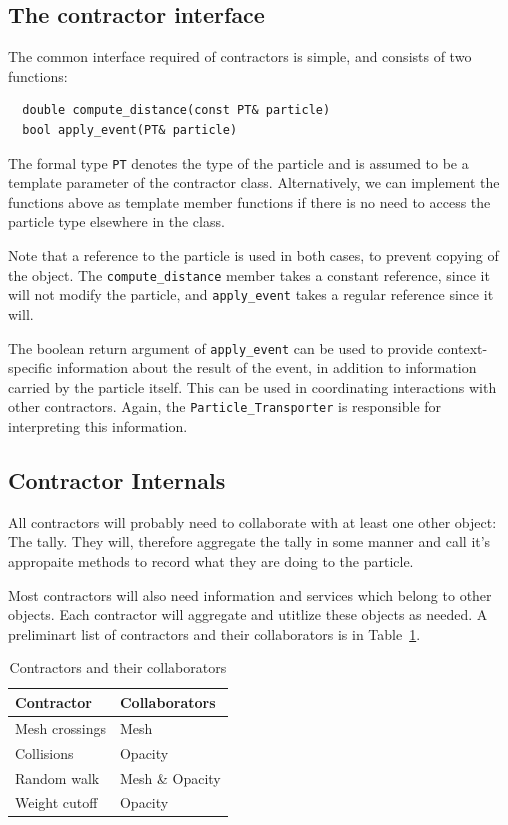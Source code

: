 \documentclass[memo]{ResearchNote}
\begin{document}
\subsection{The contractor interface}

The common interface required of contractors is simple, and consists
of two functions:
\begin{verbatim}
  double compute_distance(const PT& particle)
  bool apply_event(PT& particle)
\end{verbatim}

The formal type {\tt PT} denotes the type of the particle and is
assumed to be a template parameter of the contractor class.
Alternatively, we can implement the functions above as template member
functions if there is no need to access the particle type elsewhere in
the class.

Note that a reference to the particle is used in both cases, to
prevent copying of the object.  The {\tt compute\_distance} member
takes a constant reference, since it will not modify the particle, and
{\tt apply\_event} takes a regular reference since it will.

The boolean return argument of {\tt apply\_event} can be used to
provide context-specific information about the result of the event, in
addition to information carried by the particle itself. This can be
used in coordinating interactions with other contractors. Again, the
{\tt Particle\_Transporter} is responsible for interpreting this
information. 

\subsection{Contractor Internals}

All contractors will probably need to collaborate with at least one
other object: The tally. They will, therefore aggregate the tally in
some manner and call it's appropaite methods to record what they are
doing to the particle.

Most contractors will also need information and services which belong
to other objects. Each contractor will aggregate and utitlize these
objects as needed. A preliminart list of contractors and their
collaborators is in Table~\ref{tab:contractor_collaborators}.

\begin{table}[htb]
  \begin{center}
    \begin{tabular}{|l|l|}\hline
      Contractor & Collaborators \\ \hline
      Mesh crossings & Mesh  \\
      Collisions     & Opacity \\
      Random walk    & Mesh \& Opacity \\ 
      Weight cutoff  & Opacity \\ \hline
    \end{tabular}
    \caption{Contractors and their collaborators}
    \label{tab:contractor_collaborators}
  \end{center}
\end{table}
      
\end{document}
